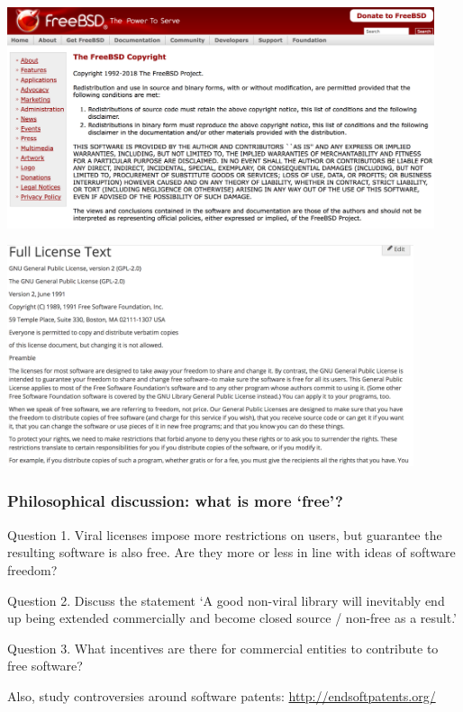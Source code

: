 \documentclass{beamer} %
\begin{document}
\begin{frame}
  \hspace{-8mm}\includegraphics[height=65mm]{assets/freebsd}
\end{frame}

\begin{frame}
  \includegraphics[height=65mm]{assets/gplv2}
\end{frame}

\begin{frame}

\frametitle{Philosophical discussion: what is more `free'?}

Question 1. Viral licenses impose more restrictions on users, but guarantee the resulting software is also free. Are they more or less in line with ideas of software freedom?

\vspace{5mm}

Question 2. Discuss the statement `A good non-viral library will inevitably end up being extended commercially and become closed source / non-free as a result.'

\vspace{5mm}

Question 3. What incentives are there for commercial entities to contribute to free software?

\vspace{5mm}
Also, study controversies around software patents: \url{http://endsoftpatents.org/}

\end{frame}
\end{document}

